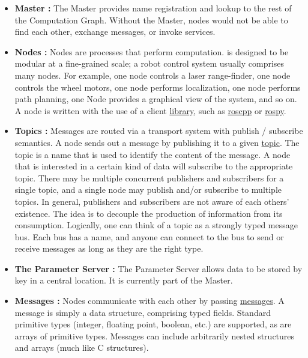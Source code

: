 \begin{itemize}
\item \textbf{Master : }
The \ros Master provides name registration and lookup to the rest of the Computation Graph. Without the Master, nodes would not be able to find each other, exchange messages, or invoke services.

\item \textbf{Nodes : } 
Nodes are processes that perform computation. \ros is designed to be modular at a fine-grained scale; a robot control system usually comprises many nodes. For example, one node controls a laser range-finder, one node controls the wheel motors, one node performs localization, one node performs path planning, one Node provides a graphical view of the system, and so on. A \ros node is written with the use of a \ros client \href{http://wiki.ros.org/Client\%20Libraries}{library}, such as \href{http://wiki.ros.org/roscpp}{roscpp} or \href{http://wiki.ros.org/rospy}{rospy}.

\item \textbf{Topics : } Messages are routed via a transport system with publish / subscribe semantics. A node sends out a message by publishing it to a given \href{http://wiki.ros.org/Topics}{topic}. The topic is a name that is used to identify the content of the message. A node that is interested in a certain kind of data will subscribe to the appropriate topic. There may be multiple concurrent publishers and subscribers for a single topic, and a single node may publish and/or subscribe to multiple topics. In general, publishers and subscribers are not aware of each others' existence. The idea is to decouple the production of information from its consumption. Logically, one can think of a topic as a strongly typed message bus. Each bus has a name, and anyone can connect to the bus to send or receive messages as long as they are the right type.

\item \textbf{The Parameter Server : }The Parameter Server allows data to be stored by key in a central location. It is currently part of the Master.

\item \textbf{Messages : }Nodes communicate with each other by passing \href{http://wiki.ros.org/Messages}{messages}. A message is simply a data structure, comprising typed fields. Standard primitive types (integer, floating point, boolean, etc.) are supported, as are arrays of primitive types. Messages can include arbitrarily nested structures and arrays (much like C structures).

\end{itemize}

